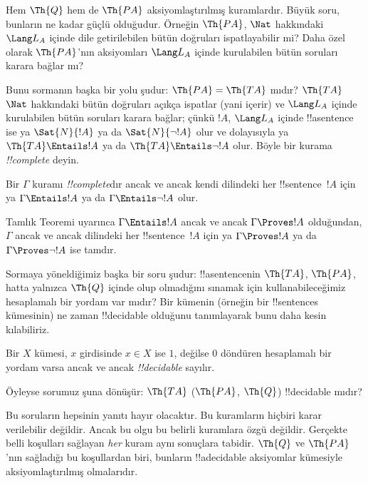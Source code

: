 Hem $\Th{Q}$ hem de $\Th{PA}$ aksiyomlaştırılmış kuramlardır. Büyük soru,
bunların ne kadar güçlü olduğudur. Örneğin $\Th{PA}$, $\Nat$ hakkındaki
$\Lang L_A$ içinde dile getirilebilen bütün doğruları ispatlayabilir mi?
Daha özel olarak $\Th{PA}$'nın aksiyomları $\Lang L_A$ içinde kurulabilen
bütün soruları karara bağlar mı?

Bunu sormanın başka bir yolu şudur: $\Th{PA} = \Th{TA}$ mıdır? $\Th{TA}$
$\Nat$ hakkındaki bütün doğruları açıkça ispatlar (yani içerir) ve
$\Lang L_A$ içinde kurulabilen bütün soruları karara bağlar; çünkü $!A$,
$\Lang L_A$ içinde !!a{sentence} ise ya $\Sat{N}{!A}$ ya da
$\Sat{N}{\lnot !A}$ olur ve dolayısıyla ya $\Th{TA} \Entails !A$ ya da
$\Th{TA} \Entails \lnot !A$ olur. Böyle bir kurama \emph{!!{complete}}
deyin.

\begin{defn}
Bir $\Gamma$ kuramı \emph{!!{complete}}dır ancak ve ancak kendi dilindeki
her !!{sentence}~$!A$ için ya $\Gamma \Entails !A$ ya da
$\Gamma \Entails \lnot !A$ olur.
\end{defn}

\begin{explain}
Tamlık Teoremi uyarınca $\Gamma \Entails !A$ ancak ve ancak
$\Gamma \Proves !A$ olduğundan, $\Gamma$ ancak ve ancak dilindeki her
!!{sentence}~$!A$ için ya $\Gamma \Proves !A$ ya da
$\Gamma \Proves \lnot !A$ ise tamdır.
\end{explain}

Sormaya yöneldiğimiz başka bir soru şudur: !!a{sentence}{}nin $\Th{TA}$,
$\Th{PA}$, hatta yalnızca $\Th{Q}$ içinde olup olmadığını sınamak için
kullanabileceğimiz hesaplamalı bir yordam var mıdır? Bir kümenin (örneğin
bir !!{sentence}s kümesinin) ne zaman !!{decidable} olduğunu tanımlayarak
bunu daha kesin kılabiliriz.

\begin{defn}
Bir $X$ kümesi, $x$ girdisinde $x \in X$ ise $1$, değilse $0$ döndüren
hesaplamalı bir yordam varsa ancak ve ancak \emph{!!{decidable}} sayılır.
\end{defn}

Öyleyse sorumuz şuna dönüşür: $\Th{TA}$ ($\Th{PA}$, $\Th{Q}$)
!!{decidable} mıdır?

Bu soruların hepsinin yanıtı hayır olacaktır. Bu kuramların hiçbiri karar
verilebilir değildir. Ancak bu olgu bu belirli kuramlara özgü değildir.
Gerçekte belli koşulları sağlayan \emph{her} kuram aynı sonuçlara tabidir.
$\Th{Q}$ ve $\Th{PA}$'nın sağladığı bu koşullardan biri, bunların
!!a{decidable} aksiyomlar kümesiyle aksiyomlaştırılmış olmalarıdır.

